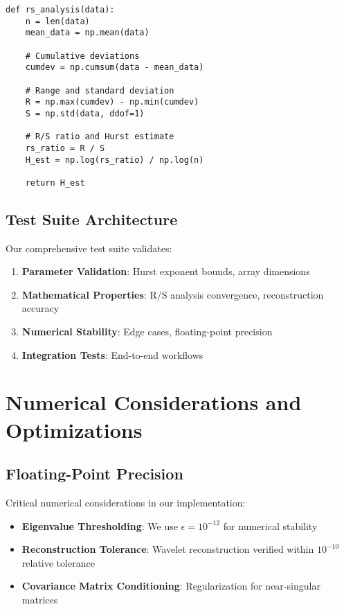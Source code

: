 \documentclass[11pt,a4paper]{article}
\begin{document}
\begin{lstlisting}
def rs_analysis(data):
    n = len(data)
    mean_data = np.mean(data)
    
    # Cumulative deviations
    cumdev = np.cumsum(data - mean_data)
    
    # Range and standard deviation
    R = np.max(cumdev) - np.min(cumdev)
    S = np.std(data, ddof=1)
    
    # R/S ratio and Hurst estimate
    rs_ratio = R / S
    H_est = np.log(rs_ratio) / np.log(n)
    
    return H_est
\end{lstlisting}

\subsection{Test Suite Architecture}

Our comprehensive test suite validates:

\begin{enumerate}
    \item \textbf{Parameter Validation}: Hurst exponent bounds, array dimensions
    \item \textbf{Mathematical Properties}: R/S analysis convergence, reconstruction accuracy
    \item \textbf{Numerical Stability}: Edge cases, floating-point precision
    \item \textbf{Integration Tests}: End-to-end workflows
\end{enumerate}

\section{Numerical Considerations and Optimizations}

\subsection{Floating-Point Precision}

Critical numerical considerations in our implementation:

\begin{itemize}
    \item \textbf{Eigenvalue Thresholding}: We use $\epsilon = 10^{-12}$ for numerical stability
    \item \textbf{Reconstruction Tolerance}: Wavelet reconstruction verified within $10^{-10}$ relative tolerance
    \item \textbf{Covariance Matrix Conditioning}: Regularization for near-singular matrices
\end{itemize}
\end{document}

